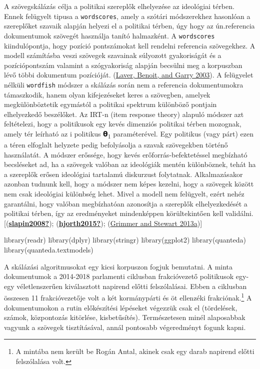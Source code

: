 \documentclass[
]{book}
\newenvironment{Shaded}{\begin{snugshade}}{\end{snugshade}}
\newcommand{\FunctionTok}[1]{\textcolor[rgb]{0.00,0.00,0.00}{#1}}
\newcommand{\NormalTok}[1]{#1}
\begin{document}
A szövegskálázás célja a politikai szereplők elhelyezése az ideológiai
térben. Ennek felügyelt tipusa a \texttt{wordscores}, amely a szótári
módszerekhez hasonlóan a szereplőket szavaik alapján helyezi el a
politikai térben, úgy hogy az ún.referencia dokumentumok szövegét
használja tanító halmazként. A \texttt{wordscores} kiindulópontja, hogy
pozíció pontszámokat kell rendelni referencia szövegekhez. A modell
számításba veszi szövegek szavainak súlyozott gyakoriságát és a
pozíciópontszám valamint a szógyakoriság alapján becsülni meg a
korpuszban lévő többi dokumentum pozícióját.
(\protect\hyperlink{ref-laver2003extracting}{Laver, Benoit, and Garry
2003}). A felügyelet nélküli \texttt{wordfish} módszer a skálázás során
nem a referencia dokumentumokra támaszkodik, hanem olyan kifejezéseket
keres a szövegben, amelyek megkülönböztetik egymástól a politikai
spektrum különböző pontjain elhelyezkedő beszélőket. Az IRT-n (item
response theory) alapuló módszer azt feltételezi, hogy a politikusok egy
kevés dimenziós politikai térben mozognak, amely tér leírható az i
politikus 𝝷\textsubscript{1} paraméterével. Egy politikus (vagy párt)
ezen a téren elfoglalt helyzete pedig befolyásolja a szavak szövegekben
történő használatát. A módszer erőssége, hogy kevés
erőforrás-befektetéssel megbízható becsléseket ad, ha a szövegek valóban
az ideológiák mentén különböznek, tehát ha a szereplők erősen ideológiai
tartalamú diskurzust folytatnak. Alkalmazásakor azonban tudnunk kell,
hogy a módszer nem képes kezelni, hogy a szövegek között nem csak
ideológiai különbség lehet. Mivel a modell nem felügyelt, ezért nehéz
garantálni, hogy valóban megbízhatóan azonosítja a szereplők
elhelyezkedését a politikai térben, így az eredményeket mindenképpen
körültekintően kell validálni.
{[}(\protect\hyperlink{ref-slapin2008}{\textbf{slapin2008?}});
(\protect\hyperlink{ref-hjorth2015}{\textbf{hjorth2015?}});
(\protect\hyperlink{ref-grimmer2013text}{Grimmer and Stewart 2013a}){]}

\begin{Shaded}
\begin{Highlighting}[]
\FunctionTok{library}\NormalTok{(readr)}
\FunctionTok{library}\NormalTok{(dplyr)}
\FunctionTok{library}\NormalTok{(stringr)}
\FunctionTok{library}\NormalTok{(ggplot2)}
\FunctionTok{library}\NormalTok{(quanteda)}
\FunctionTok{library}\NormalTok{(quanteda.textmodels)}
\end{Highlighting}
\end{Shaded}

A skálázási algoritmusokat egy kicsi korpuszon fogjuk bemutatni. A minta
dokumentumok a 2014-2018 parlamenti ciklusban frakcióvezető politikusok
egy-egy véletlenszerűen kiválasztott napirend előtti felszólalásai.
Ebben a ciklusban összesen 11 frakcióvezetője volt a két kormánypárti és
öt ellenzéki frakciónak.\footnote{A mintába nem került be Rogán Antal,
  akinek csak egy darab napirend előtti felszólalása volt.} A
dokumentumokon a rutin előkészítési lépéseket végezzük csak el
(tördelések, számok, központozás kitörlése, kisbetűsítés). Természetesen
minél alaposabbak vagyunk a szövegek tisztításával, annál pontosabb
végeredményt fogunk kapni.
\end{document}
